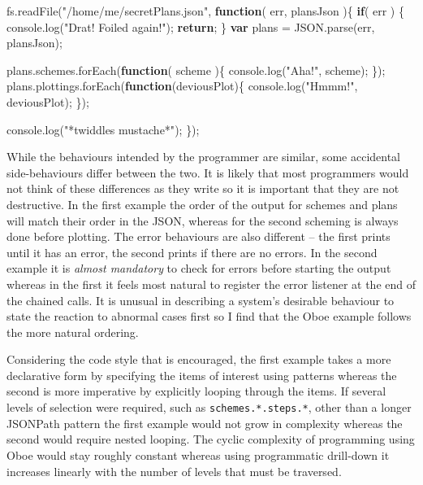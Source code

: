 \documentclass[12pt, ]{article}
\newenvironment{Shaded}{}{}
\newcommand{\KeywordTok}[1]{\textcolor[rgb]{0.00,0.44,0.13}{\textbf{{#1}}}}
\newcommand{\StringTok}[1]{\textcolor[rgb]{0.25,0.44,0.63}{{#1}}}
\newcommand{\OtherTok}[1]{\textcolor[rgb]{0.00,0.44,0.13}{{#1}}}
\newcommand{\FunctionTok}[1]{\textcolor[rgb]{0.02,0.16,0.49}{{#1}}}
\newcommand{\NormalTok}[1]{{#1}}
\begin{document}
\begin{Shaded}
\begin{Highlighting}[]
\OtherTok{fs}\NormalTok{.}\FunctionTok{readFile}\NormalTok{(}\StringTok{"/home/me/secretPlans.json"}\NormalTok{, }\KeywordTok{function}\NormalTok{( err, plansJson )\{     }
   \KeywordTok{if}\NormalTok{( err ) \{}
      \OtherTok{console}\NormalTok{.}\FunctionTok{log}\NormalTok{(}\StringTok{"Drat! Foiled again!"}\NormalTok{);}
      \KeywordTok{return}\NormalTok{;}
   \NormalTok{\}}
   \KeywordTok{var} \NormalTok{plans = }\OtherTok{JSON}\NormalTok{.}\FunctionTok{parse}\NormalTok{(err, plansJson);}
   
   \OtherTok{plans}\NormalTok{.}\OtherTok{schemes}\NormalTok{.}\FunctionTok{forEach}\NormalTok{(}\KeywordTok{function}\NormalTok{( scheme )\{}
      \OtherTok{console}\NormalTok{.}\FunctionTok{log}\NormalTok{(}\StringTok{"Aha!"}\NormalTok{, scheme);   }
   \NormalTok{\});   }
   \OtherTok{plans}\NormalTok{.}\OtherTok{plottings}\NormalTok{.}\FunctionTok{forEach}\NormalTok{(}\KeywordTok{function}\NormalTok{(deviousPlot)\{}
      \OtherTok{console}\NormalTok{.}\FunctionTok{log}\NormalTok{(}\StringTok{"Hmmm!"}\NormalTok{, deviousPlot);}
   \NormalTok{\});}
      
   \OtherTok{console}\NormalTok{.}\FunctionTok{log}\NormalTok{(}\StringTok{"*twiddles mustache*"}\NormalTok{);   }
\NormalTok{\});}
\end{Highlighting}
\end{Shaded}

While the behaviours intended by the programmer are similar, some
accidental side-behaviours differ between the two. It is likely that
most programmers would not think of these differences as they write so
it is important that they are not destructive. In the first example the
order of the output for schemes and plans will match their order in the
JSON, whereas for the second scheming is always done before plotting.
The error behaviours are also different -- the first prints until it has
an error, the second prints if there are no errors. In the second
example it is \emph{almost mandatory} to check for errors before
starting the output whereas in the first it feels most natural to
register the error listener at the end of the chained calls. It is
unusual in describing a system's desirable behaviour to state the
reaction to abnormal cases first so I find that the Oboe example follows
the more natural ordering.

Considering the code style that is encouraged, the first example takes a
more declarative form by specifying the items of interest using patterns
whereas the second is more imperative by explicitly looping through the
items. If several levels of selection were required, such as
\texttt{schemes.*.steps.*}, other than a longer JSONPath pattern the
first example would not grow in complexity whereas the second would
require nested looping. The cyclic complexity of programming using Oboe
would stay roughly constant whereas using programmatic drill-down it
increases linearly with the number of levels that must be traversed.
\end{document}
